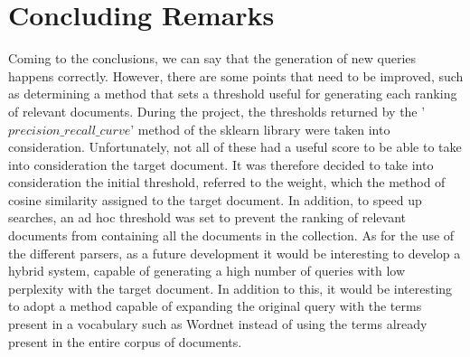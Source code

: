 \section*{Concluding Remarks}
Coming to the conclusions, we can say that the generation of new queries happens correctly. However, there are some points that need to be improved, such as determining a method that sets a threshold useful for generating each ranking of relevant documents. During the project, the thresholds returned by the '$precision\_recall\_curve$' method of the sklearn library were taken into consideration. Unfortunately, not all of these had a useful score to be able to take into consideration the target document. It was therefore decided to take into consideration the initial threshold, referred to the weight, which the method of cosine similarity assigned to the target document. In addition, to speed up searches, an ad hoc threshold was set to prevent the ranking of relevant documents from containing all the documents in the collection. As for the use of the different parsers, as a future development it would be interesting to develop a hybrid system, capable of generating a high number of queries with low perplexity with the target document. In addition to this, it would be interesting to adopt a method capable of expanding the original query with the terms present in a vocabulary such as Wordnet instead of using the terms already present in the entire corpus of documents.